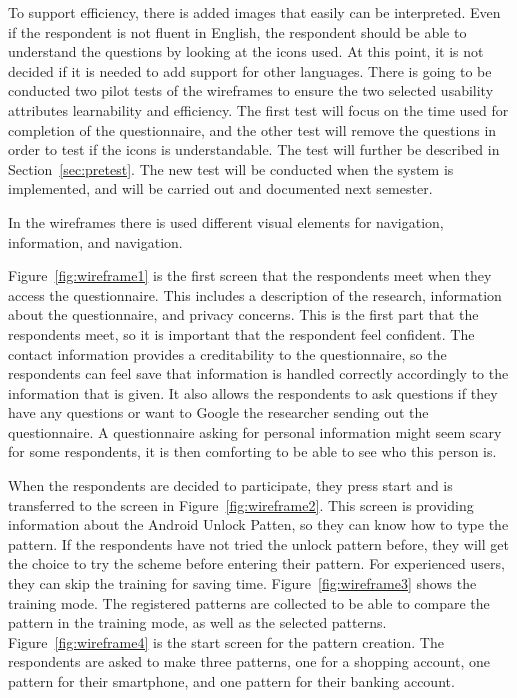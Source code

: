   To support efficiency, there is added images that easily can be interpreted. Even if the respondent is not fluent in English, the respondent should be able to understand the questions by looking at the icons used. At this point, it is not decided if it is needed to add support for other languages. There is going to be conducted two pilot tests of the wireframes to ensure the two selected usability attributes learnability and efficiency. The first test will focus on the time used for completion of the questionnaire, and the other test will remove the questions in order to test if the icons is understandable. The test will further be described in Section~\ref{sec:pretest}. The new test will be conducted when the system is implemented, and will be carried out and documented next semester.


  In the wireframes there is used different visual elements for navigation, information, and navigation. 

  Figure~\ref{fig:wireframe1} is the first screen that the respondents meet when they access the questionnaire. This includes a description of the research, information about the questionnaire, and privacy concerns. This is the first part that the respondents meet, so it is important that the respondent feel confident. The contact information provides a creditability to the questionnaire, so the respondents can feel save that information is handled correctly accordingly to the information that is given. It also allows the respondents to ask questions if they have any questions or want to Google the researcher sending out the questionnaire. A questionnaire asking for personal information might seem scary for some respondents, it is then comforting to be able to see who this person is.

  When the respondents are decided to participate, they press start and is transferred to the screen in Figure~\ref{fig:wireframe2}. This screen is providing information about the Android Unlock Patten, so they can know how to type the pattern. If the respondents have not tried the unlock pattern before, they will get the choice to try the scheme before entering their pattern. For experienced users, they can skip the training for saving time. Figure~\ref{fig:wireframe3} shows the training mode. The registered patterns are collected to be able to compare the pattern in the training mode, as well as the selected patterns. Figure~\ref{fig:wireframe4} is the start screen for the pattern creation. The respondents are asked to make three patterns, one for a shopping account, one pattern for their smartphone, and one pattern for their banking account.

